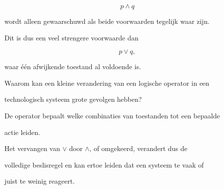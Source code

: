 \documentclass{ximera}
\begin{document}
\begin{oefening}{\oefG}
\begin{question}
\begin{oplossing}
\[
p\land q
\]

wordt alleen gewaarschuwd als beide voorwaarden tegelijk waar zijn.

Dit is dus een veel strengere voorwaarde dan

\[
p\lor q,
\]

waar één afwijkende toestand al voldoende is.

\end{oplossing}

\end{question}



\begin{question}

Waarom kan een kleine verandering van een logische operator in een

technologisch systeem grote gevolgen hebben?

\begin{oplossing}

De operator bepaalt welke combinaties van toestanden tot een bepaalde

actie leiden.

Het vervangen van $\lor$ door $\land$, of omgekeerd, verandert dus de

volledige beslisregel en kan ertoe leiden dat een systeem te vaak of

juist te weinig reageert.

\end{oplossing}

\end{question}

\end{oefening}
\end{document}
